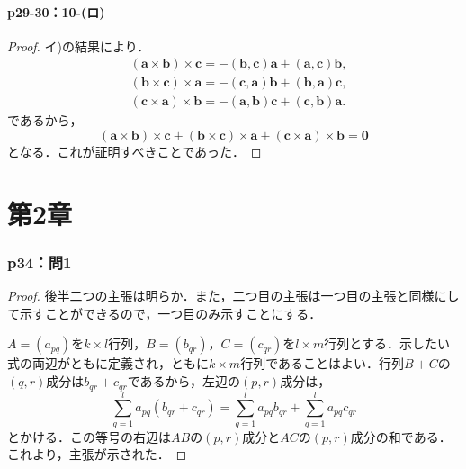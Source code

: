 \documentclass[a4paper,10pt,fleqn]{ltjsarticle}
\begin{document}
\subsection*{p29-30：10-(ロ)}

\begin{tleftbar}
    \begin{proof}
        イ)の結果により．
        \begin{align*}
             & (\bm{a}\times\bm{b}) \times \bm{c} =  -(\bm{b},\bm{c})\bm{a}+(\bm{a},\bm{c}) \bm{b} ,    \\
             & (\bm{b} \times \bm{c} ) \times \bm{a} = -(\bm{c},\bm{a}) \bm{b} +(\bm{b},\bm{a}) \bm{c}, \\
             & (\bm{c} \times \bm{a} ) \times \bm{b} = -(\bm{a},\bm{b}) \bm{c} +(\bm{c},\bm{b}) \bm{a}.
        \end{align*}
        であるから，
        \[
            (\bm{a}\times\bm{b}) \times \bm{c} + (\bm{b} \times \bm{c} ) \times \bm{a}+(\bm{c} \times \bm{a} ) \times \bm{b} =\bm{0}
        \]
        となる．これが証明すべきことであった．
    \end{proof}
\end{tleftbar}


\part*{第2章}


\section*{p34：問1}

\begin{tleftbar}
    \begin{proof}
        後半二つの主張は明らか．また，二つ目の主張は一つ目の主張と同様にして示すことができるので，一つ目のみ示すことにする．


        $A=(a_{pq})$を$k \times l$行列，$B= (b_{qr})$，$C=(c_{qr})$を$l \times m$行列とする．示したい式の両辺がともに定義され，ともに$k \times m$行列であることはよい．行列$B+C$の$(q,r)$成分は$b_{qr}+c_{qr}$であるから，左辺の$(p,r)$成分は，
        \[
            \sum_{q=1}^{l}a_{pq}\left(b_{qr}+c_{qr}\right)=\sum_{q=1}^{l}a_{pq}b_{qr}+\sum_{q=1}^{l}a_{pq}c_{qr}
        \]
        とかける．この等号の右辺は$AB$の$(p,r)$成分と$AC$の$(p,r)$成分の和である．これより，主張が示された．
    \end{proof}
\end{tleftbar}
\end{document}

